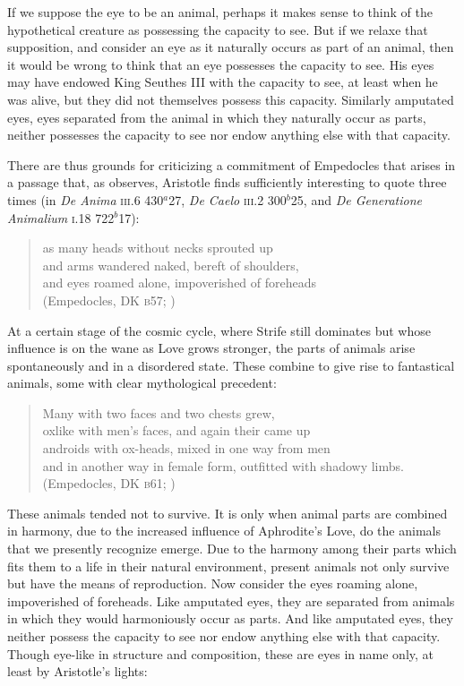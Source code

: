If we suppose the eye to be an animal, perhaps it makes sense to think of the hypothetical creature as possessing the capacity to see. But if we relaxe that supposition, and consider an eye as it naturally occurs as part of an animal, then it would be wrong to think that an eye possesses the capacity to see. His eyes may have endowed King Seuthes III with the capacity to see, at least when he was alive, but they did not themselves possess this capacity. Similarly amputated eyes, eyes separated from the animal in which they naturally occur as parts, neither possesses the capacity to see nor endow anything else with that capacity. 

There are thus grounds for criticizing a commitment of Empedocles that arises in a passage that, as \citet[211]{Wright:1981zr} observes, Aristotle finds sufficiently interesting to quote three times (in \emph{De Anima} \textsc{iii}.6 430\( ^{a} \)27, \emph{De Caelo} \textsc{iii}.2 300\( ^{b} \)25, and \emph{De Generatione Animalium} \textsc{i}.18 722\( ^{b} \)17):
\begin{verse}
	as many heads without necks sprouted up\\
	and arms wandered naked, bereft of shoulders,\\
	and eyes roamed alone, impoverished of foreheads\\
	(Empedocles, DK \textsc{b}57; \citealt[64 245]{Inwood:2001ve})
\end{verse}
At a certain stage of the cosmic cycle, where Strife still dominates but whose influence is on the wane as Love grows stronger, the parts of animals arise spontaneously and in a disordered state. These combine to give rise to fantastical animals, some with clear mythological precedent:
\begin{verse}
	Many with two faces and two chests grew,\\
	oxlike with men's faces, and again their came up\\
	androids with ox-heads, mixed in one way from men\\
	and in another way in female form, outfitted with shadowy limbs.\\
	(Empedocles, DK \textsc{b}61; \citealt[66 247]{Inwood:2001ve})
\end{verse}
These animals tended not to survive. It is only when animal parts are combined in harmony, due to the increased influence of Aphrodite's Love, do the animals that we presently recognize emerge. Due to the harmony among their parts which fits them to a life in their natural environment, present animals not only survive but have the means of reproduction. Now consider the eyes roaming alone, impoverished of foreheads. Like amputated eyes, they are separated from animals in which they would harmoniously occur as parts. And like amputated eyes, they neither possess the capacity to see nor endow anything else with that capacity. Though eye-like in structure and composition, these are eyes in name only, at least by Aristotle's lights:
